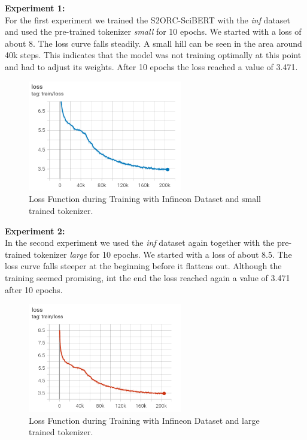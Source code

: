 \textbf{Experiment 1:}\\
For the first experiment we trained the S2ORC-SciBERT with the \textit{inf} dataset and used the pre-trained tokenizer \textit{small} for 10 epochs. We started with a loss of about 8. The loss curve falls steadily. A small hill can be seen in the area around 40k steps. This indicates that the model was not training optimally at this point and had to adjust its weights. After 10 epochs the loss reached a value of 3.471.
\begin{figure}[H]
	\centering
	\includegraphics[width=0.6\textwidth]{figures/loss_inf_small.png}
	\caption{Loss Function during Training with Infineon Dataset and small trained tokenizer.}
	\label{fig:loss_small}
\end{figure}

\textbf{Experiment 2:}\\
In the second experiment we used the \textit{inf} dataset again together with the pre-trained tokenizer \textit{large} for 10 epochs. We started with a loss of about 8.5. The loss curve falls steeper at the beginning before it flattens out. Although the training seemed promising, int the end the loss reached again a value of 3.471 after 10 epochs.
\begin{figure}[H]
	\centering
	\includegraphics[width=0.6\textwidth]{figures/loss_inf_large.png}
	\caption{Loss Function during Training with Infineon Dataset and large trained tokenizer.}
	\label{fig:loss_large}
\end{figure}

